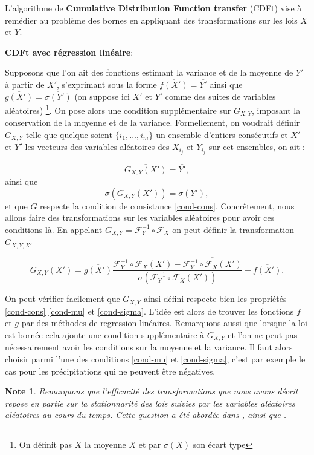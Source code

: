 \documentclass[a4paper,10pt]{article}
\newtheorem{note}{Note}
\begin{document}
L'algorithme de \textbf{Cumulative Distribution Function transfer} (CDFt) vise à remédier au problème des bornes en appliquant des transformations sur les lois $X$ et $Y$.

\noindent \textbf{CDFt avec régression linéaire}:

Supposons que l'on ait des fonctions estimant la variance et de la moyenne de $Y'$ à partir de $X'$, s'exprimant sous la forme $\overline{f(X')} = \overline{Y'}$ ainsi que $\overline{g(X')} = \overline{\sigma(Y')}$ (on suppose ici $X'$ et $Y'$ comme des suites de variables aléatoires) \footnote{On définit pas $\overline{X}$ la  moyenne $X$ et par $\sigma(X)$ son écart type}.  
On pose alors une condition supplémentaire sur $G_{X,Y}$, imposant la conservation de la moyenne et de la variance. Formellement, on voudrait définir $G_{X,Y}$ telle que quelque soient $\{i_1,...,i_m\}$ un ensemble d'entiers consécutifs et $X'$ et $Y'$ les vecteurs des variables aléatoires des $X_{i_j}$ et $Y_{i_j}$ sur cet ensembles, on ait :

\begin{equation}
	\label{cond-mu}
	\overline{G_{X,Y}(X')}=\overline{Y'},
\end{equation}
ainsi que
\begin{equation}
	\label{cond-sigma}
	\sigma({G_{X,Y}(X')})=\sigma(Y'),
\end{equation}
et que $G$ respecte la condition de consistance \eqref{cond-cons}.
Concrêtement, nous allons faire des transformations sur les variables aléatoires pour avoir ces conditions là. En appelant $G_{X,Y}= \mathcal{F}^{-1}_{Y}\circ\mathcal{F}_{X}$ on peut définir la transformation $G_{X,Y,X'}$

\[ G_{X,Y} (X')= \overline{g(X')}\frac{\mathcal{F}^{-1}_{Y}\circ\mathcal{F}_{X}(X')- \overline{\mathcal{F}^{-1}_{Y}\circ\mathcal{F}_{X}(X')}}{\sigma(\mathcal{F}^{-1}_{Y}\circ\mathcal{F}_{X}(X'))} + \overline{f(X')}.\]

On peut vérifier facilement que $G_{X,Y}$ ainsi défini respecte bien les propriétés \eqref{cond-cons} \eqref{cond-mu} et \eqref{cond-sigma}. L'idée est alors de trouver les fonctions $f$ et $g$ par des méthodes de regression linéaires. Remarquons aussi que lorsque la loi est bornée cela ajoute une condition supplémentaire à $G_{X,Y}$ et l'on ne peut pas nécessairement avoir les conditions sur la moyenne et la variance. Il faut alors choisir parmi l'une des conditions \eqref{cond-mu} et \eqref{cond-sigma}, c'est par exemple le cas pour les précipitations qui ne peuvent être négatives. 
\begin{note}
	Remarquons que l'efficacité des transformations que nous avons décrit repose en partie sur la stationnarité des lois suivies par les variables aléatoires aléatoires au cours du temps. Cette question a été abordée dans \cite{maraun2012nonstationarities}, \cite{christensen2008need} ainsi que \cite{nahar2017assessing}.  
\end{note}
\end{document}
